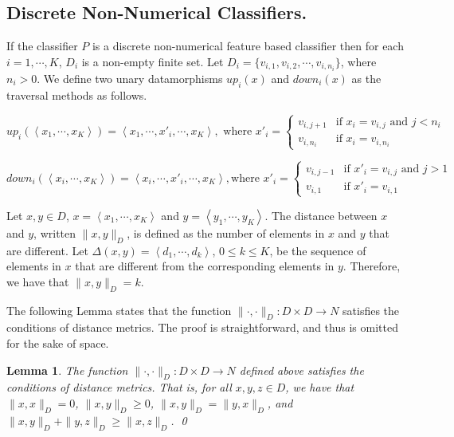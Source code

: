 \documentclass[preprint,1p,authoryear,times]{elsarticle}
\newtheorem{Lemma}{Lemma}
\begin{document}
\subsection{Discrete Non-Numerical Classifiers.}

If the classifier $P$ is a discrete non-numerical feature based classifier then for each $i=1, \cdots, K$, $D_i$ is a non-empty finite set. Let $D_i = \{v_{i,1}, v_{i,2}, \cdots, v_{i,n_i}\}$, where $n_i >0$. We define two unary datamorphisms $up_i(x)$ and $down_i(x)$ as the traversal methods as follows.

\begin{equation}
up_i(\left<x_1, \cdots, x_K\right>)=\left<x_1, \cdots, x'_i, \cdots, x_K\right>, 
\textrm{ where }
x'_i = \left\{\begin{array}{ll}
v_{i,j+1} & \textrm{if $x_i = v_{i,j}$ and $j < n_i$}\\
v_{i,n_i} & \textrm{if $x_i = v_{i,n_i}$}
\end{array} \right.
\label{eqn:e2_1}
\end{equation}

\begin{equation}
down_i(\left<x_i, \cdots, x_K\right>)=\left<x_i, \cdots, x'_i, \cdots, x_K\right>, 
\textrm{where }
x'_i = \left\{\begin{array}{ll}
v_{i,j-1} & \textrm{if $x'_i = v_{i,j}$ and $j>1$}\\
v_{i,1} & \textrm{if $x'_i = v_{i,1}$}
\end{array} \right.
\label{eqn:e2_2}
\end{equation}

Let $x, y \in D$, $x=\left<x_1, \cdots, x_K\right>$ and $y=\left<y_1, \cdots, y_K\right>$. The distance between $x$ and $y$, written $\| x, y \|_D$, is defined as the number of elements in $x$ and $y$ that are different. Let $\Delta(x,y)=\left<d_1, \cdots, d_k\right>$, $0\leq k \leq K$, be the sequence of elements in $x$ that are different from the corresponding elements in $y$. Therefore, we have that $\| x, y \|_D = k$. 

The following Lemma states that the function $\| \cdot, \cdot \|_D : D \times D \rightarrow N$ satisfies the conditions of distance metrics. The proof is straightforward, and thus is omitted for the sake of space. 

\begin{Lemma}\label{lmm:Lmm2_1}
The function $\|\cdot,\cdot \|_D: D \times D \rightarrow N$ defined above satisfies the conditions of distance metrics. That is, for all $x,y,z \in D$, we have that $\|x, x\|_D=0$, $\|x,y\|_D\geq 0$, $\|x,y\|_D = \|y,x\|_D$, and $\|x,y\|_D + \|y,z\|_D \geq \|x,z\|_D$. \qed
\end{Lemma}
\end{document}
